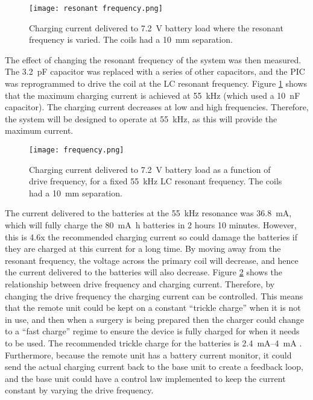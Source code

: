 \begin{figure}[htbp]
	\centering
	\texttt{[image: resonant frequency.png]}
	\caption{Charging current delivered to \SI{7.2}{\volt} battery load where the resonant frequency is varied. The coils had a \SI{10}{\milli\metre} separation.}
	\label{fig: current resonance}
\end{figure}

The effect of changing the resonant frequency of the system was then measured. The \SI{3.2}{\pico\farad} capacitor was replaced with a series of other capacitors, and the PIC was reprogrammed to drive the coil at the LC resonant frequency. Figure \ref{fig: current resonance} shows that the maximum charging current is achieved at \SI{55}{\kilo\hertz} (which used a \SI{10}{\nano\farad} capacitor). The charging current decreases at low and high frequencies. %
Therefore, the system will be designed to operate at \SI{55}{\kilo\hertz}, as this will provide the maximum current.\\

\begin{figure}[htbp]
	\centering
	\texttt{[image: frequency.png]}
	\caption{Charging current delivered to \SI{7.2}{\volt} battery load as a function of drive frequency, for a fixed \SI{55}{\kilo\hertz} LC resonant frequency. The coils had a \SI{10}{\milli\metre} separation.}
	\label{fig: current frequency}
\end{figure}

The current delivered to the batteries at the \SI{55}{\kilo\hertz} resonance was \SI{36.8}{\milli\ampere}, which will fully charge the \SI{80}{\milli\ampere\hour} batteries in 2 hours 10 minutes. However, this is 4.6x the recommended charging current so could damage the batteries if they are charged at this current for a long time. By moving away from the resonant frequency, the voltage across the primary coil will decrease, and hence the current delivered to the batteries will also decrease. Figure \ref{fig: current frequency} shows the relationship between drive frequency and charging current. Therefore, by changing the drive frequency the charging current can be controlled. This means that the remote unit could be kept on a constant ``trickle charge'' when it is not in use, and then when a surgery is being prepared then the charger could change to a ``fast charge'' regime to ensure the device is fully charged for when it needs to be used. The recommended trickle charge for the batteries is \SIrange{2.4}{4}{\milli\ampere} \cite{rs_pro_batteries}. Furthermore, because the remote unit has a battery current monitor, it could send the actual charging current back to the base unit to create a feedback loop, and the base unit could have a control law implemented to keep the current constant by varying the drive frequency.\\

